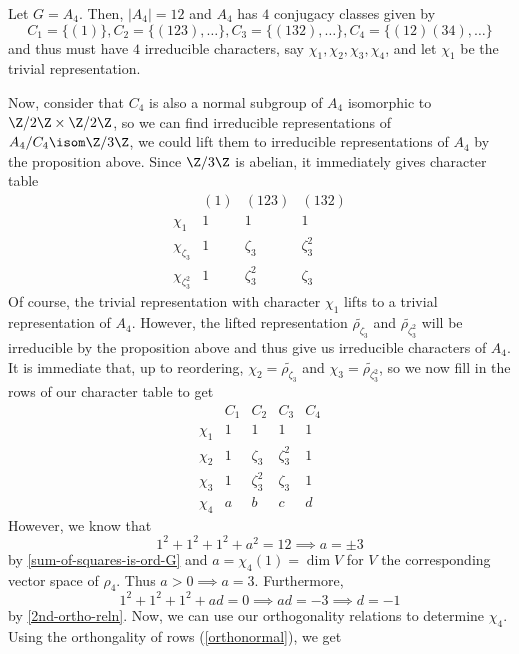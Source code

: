\documentclass[11pt,leqno,oneside]{amsbook}
\numberwithin{thm}{section}
\begin{document}
\begin{example}
  Let \(G = A_4\). Then, \(|A_4| = 12\) and \(A_4\) has \(4\)
  conjugacy classes given by \[
    C_1 = \{(1)\}, C_2 = \{(123), \ldots\}, C_3 = \{(132), \ldots\},
    C_4 = \{(12)(34), \ldots\}
  \]
  and thus must have \(4\) irreducible characters, say \(\chi_1,
  \chi_2, \chi_3, \chi_4\), and let \(\chi_1\) be the trivial
  representation.
  
  Now, consider that \(C_4\) is also a normal subgroup of \(A_4\)
  isomorphic to \(\Z/2\Z \times \Z/2\Z\), so
  we can find irreducible representations of \(A_4/C_4 \isom \Z/3\Z\), we could
  lift them to irreducible representations of \(A_4\) by the
  proposition above. Since \(\Z/3\Z\) is
  abelian, it immediately gives character table \[
    \begin{array}{c|ccc}
      & (1) & (123) & (132) \\
      \hline
      \chi_1 & 1 & 1 & 1 \\
      \chi_{\zeta_3} & 1 & \zeta_3 & \zeta_3^2 \\
      \chi_{\zeta_3^2} & 1 & \zeta_3^2 & \zeta_3
    \end{array}
  \]
  Of course, the trivial representation with character \(\chi_1\) lifts to a trivial
  representation of \(A_4\). However, the lifted representation \(\tilde{\rho_{\zeta_3}}\) and \(\tilde{\rho_{\zeta_3^2}}\) will
  be irreducible by the proposition above and thus give us irreducible
  characters of \(A_4\). It is immediate that, up to reordering,
  \(\chi_2 = \tilde{\rho_{\zeta_3}}\) and \(\chi_3 =
  \tilde{\rho_{\zeta_3^2}}\), so we now fill in the rows of our
  character table to get \[
    \begin{array}{c|cccc}
      &C_1&C_2&C_3&C_4 \\
      \hline
      \chi_1 & 1 & 1 & 1 & 1\\
      \chi_2 & 1 & \zeta_3 & \zeta_3^2 & 1\\
      \chi_3 & 1 & \zeta_3^2 & \zeta_3 & 1\\
      \chi_4 & a & b & c & d 
    \end{array}
  \]
  However, we know that \[
    1^2 + 1^2 + 1^2 +a^2 = 12 \implies a = \pm 3
  \]
    by \ref{sum-of-squares-is-ord-G} and \(a = \chi_4(1) = \dim V\) for \(V\) the corresponding vector
  space of \(\rho_4\). Thus \(a > 0 \implies a = 3\). Furthermore,
 \[
    1^2 + 1^2 + 1^2 + ad = 0 \implies ad = -3 \implies d = -1
  \]
  by \ref{2nd-ortho-reln}.
  Now, we can use our orthogonality relations to determine
  \(\chi_4\). Using the orthongality of rows (\ref{orthonormal}), we get \[
\]
\end{example}
\end{document}
